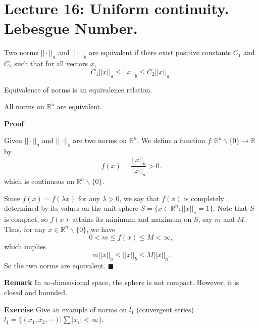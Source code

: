 \documentclass[main.tex]{subfiles}
\begin{document}
\pagestyle{plain}
\setcounter{chapter}{15}

\chapter{Lecture 16: Uniform continuity. Lebesgue Number. }
\label{chap:chapter16}

\begin{definition}
    Two norms $||\cdot||_a$ and $||\cdot||_b$ are equivalent if there exist positive constants $C_1$ and $C_2$ such that for all vectors $x$,
    \[
    C_1 ||x||_a \leq ||x||_b \leq C_2 ||x||_a.
    \]
\end{definition}

\begin{property}
    Equivalence of norms is an equivalence relation.
\end{property}

\begin{theorem}
    All norms on $\mathbb{R}^n$ are equivalent.
\end{theorem}

\par \noindent \textbf{Proof} 
\par Given $||\cdot||_a$ and $||\cdot||_b$ are two norms on $\mathbb{R}^n$. We define a function $f: \mathbb{R}^n\backslash\{0\} \to \mathbb{R}$ by 
\begin{equation}
    f(x) = \frac{||x||_b}{||x||_a} > 0.
\end{equation}
which is continuous on $\mathbb{R}^n\backslash\{0\}$. 
\par Since $f(x) = f(\lambda x) $ for any $\lambda > 0$, we say that $f(x) $ is completely determined by its values on the unit sphere $S = \{x \in \mathbb{R}^n: ||x||_a = 1\}$. Note that $S$ is compact, so $f(x)$ attains its minimum and maximum on $S$, say $m$ and $M$. Thus, for any $x \in \mathbb{R}^n\backslash\{0\}$, we have
\begin{equation}
    0 < m \leq f(x) \le M < \infty,
\end{equation}
which implies
\begin{equation}
    m ||x||_a \leq ||x||_b \leq M ||x||_a.
\end{equation}
So the two norms are equivalent. \hfill $\blacksquare$
\par \noindent \textbf{Remark} In $\infty$-dimensional space, the sphere is not compact. However, it is closed and bounded. 
\par \noindent \textbf{Exercise} Give an example of norms on $l_1$ (convergent series) $l_1 = \{(x_1, x_2, \cdots)| \sum |x_i| < \infty \}$.
\end{document}
